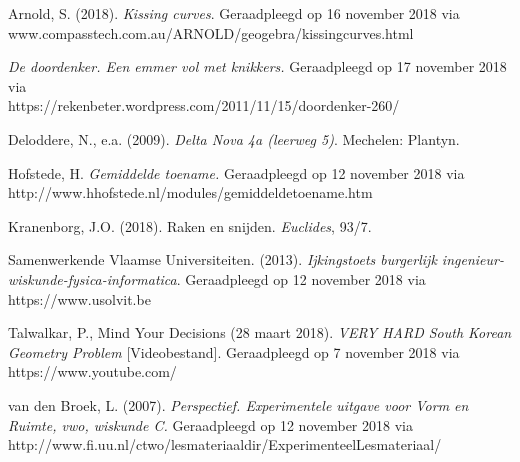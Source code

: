 \newpage
\stopcontents[mainsections]			        %
\begin{bronnen}
\item Arnold, S. (2018). \textit{Kissing curves}. Geraadpleegd op 16 november 2018 via\\ www.compasstech.com.au/ARNOLD/geogebra/kissingcurves.html
\item \textit{De doordenker. Een emmer vol met knikkers.} Geraadpleegd op 17 november 2018 via\\ https://rekenbeter.wordpress.com/2011/11/15/doordenker-260/
\item Deloddere, N., e.a. (2009). \textit{Delta Nova 4a (leerweg 5)}. Mechelen: Plantyn. 
\item Hofstede, H. \textit{Gemiddelde toename.} Geraadpleegd op 12 november 2018 via\\
http://www.hhofstede.nl/modules/gemiddeldetoename.htm
\item Kranenborg, J.O. (2018). Raken en snijden. \textit{Euclides}, 93/7.
\item Samenwerkende Vlaamse Universiteiten. (2013). \textit{Ijkingstoets burgerlijk ingenieur-wiskunde-fysica-informatica}. Geraadpleegd op 12 november 2018 via https://www.usolvit.be
\item Talwalkar, P., Mind Your Decisions (28 maart 2018). \textit{VERY HARD South Korean Geometry Problem} [Videobestand]. Geraadpleegd op 7 november 2018 via https://www.youtube.com/
\item van den Broek, L. (2007). \textit{Perspectief. Experimentele uitgave voor Vorm en Ruimte, vwo, wiskunde C.} Geraadpleegd op 12 november 2018 via  http://www.fi.uu.nl/ctwo/lesmateriaaldir/ExperimenteelLesmateriaal/
\end{bronnen}




